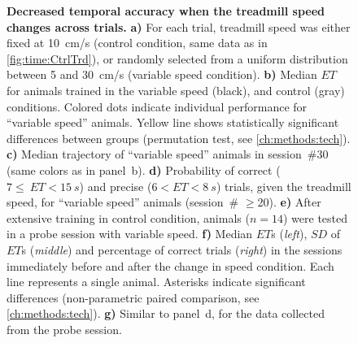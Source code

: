 \begin{figure}[bt!]
  \begin{center}
    \caption[Variable Speed Condition]
    {\textbf{Decreased temporal accuracy when the treadmill speed changes across trials.}
    \textbf{a)}
    For each trial, treadmill speed was either fixed at 10~cm/s (control condition, same data as in \autoref{fig:time:CtrlTrd}), or randomly selected from a uniform distribution between 5 and 30~cm/s (variable speed condition).
    \textbf{b)}
    Median $ET$ for animals trained in the variable speed (black), and control (gray) conditions.
    Colored dots indicate individual performance for ``variable speed'' animals.
    Yellow line shows statistically significant differences between groups (permutation test, see \autoref{ch:methods:tech}).
    \textbf{c)}
    Median trajectory of ``variable speed'' animals in session~\#30 (same colors as in panel~b).
    \textbf{d)}
    Probability of correct ($7\leq~ET<15~s$) and precise ($6<ET<8~s$) trials, given the treadmill speed, for ``variable speed'' animals (session~\# $\geq$20).
    \textbf{e)}
    After extensive training in control condition, animals ($n=14$) were tested in a probe session with variable speed.
    \textbf{f)}
    Median $ET$s (\textit{left}), $SD$ of $ET$s (\textit{middle}) and percentage of correct trials (\textit{right}) in the sessions immediately before and after the change in speed condition.
    Each line represents a single animal.
    Asterisks indicate significant differences (non-parametric paired comparison, see \autoref{ch:methods:tech}).
    \textbf{g)}
    Similar to panel~d, for the data collected from the probe session.
  }
  \label{fig:time:varTrd}
  \end{center}
\end{figure}